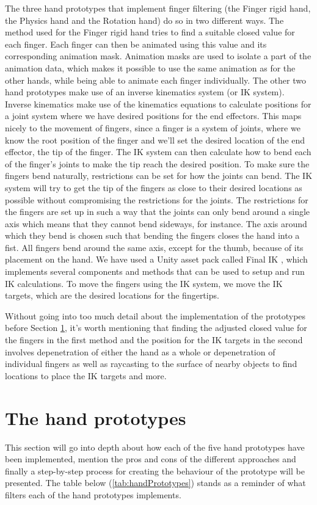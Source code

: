 The three hand prototypes that implement finger filtering (the Finger rigid hand, the Physics hand and the Rotation hand) do so in two different ways. The method used for the Finger rigid hand tries to find a suitable closed value for each finger. Each finger can then be animated using this value and its corresponding animation mask. Animation masks are used to isolate a part of the animation data, which makes it possible to use the same animation as for the other hands, while being able to animate each finger individually. The other two hand prototypes make use of an inverse kinematics system (or IK system). Inverse kinematics make use of the kinematics equations to calculate positions for a joint system where we have desired positions for the end effectors. This maps nicely to the movement of fingers, since a finger is a system of joints, where we know the root position of the finger and we'll set the desired location of the end effector, the tip of the finger. The IK system can then calculate how to bend each of the finger's joints to make the tip reach the desired position. To make sure the fingers bend naturally, restrictions can be set for how the joints can bend. The IK system will try to get the tip of the fingers as close to their desired locations as possible without compromising the restrictions for the joints. The restrictions for the fingers are set up in such a way that the joints can only bend around a single axis which means that they cannot bend sideways, for instance. The axis around which they bend is chosen such that bending the fingers closes the hand into a fist. All fingers bend around the same axis, except for the thumb, because of its placement on the hand. We have used a Unity asset pack called Final IK \parencite{RootMotion2017}, which implements several components and methods that can be used to setup and run IK calculations. To move the fingers using the IK system, we move the IK targets, which are the desired locations for the fingertips.

Without going into too much detail about the implementation of the prototypes before Section \ref{sec:handPrototypes}, it's worth mentioning that finding the adjusted closed value for the fingers in the first method and the position for the IK targets in the second involves depenetration of either the hand as a whole or depenetration of individual fingers as well as raycasting to the surface of nearby objects to find locations to place the IK targets and more.

\section{The hand prototypes}
\label{sec:handPrototypes}
This section will go into depth about how each of the five hand prototypes have been implemented, mention the pros and cons of the different approaches and finally a step-by-step process for creating the behaviour of the prototype will be presented. The table below (\ref{tab:handPrototypes}) stands as a reminder of what filters each of the hand prototypes implements.

